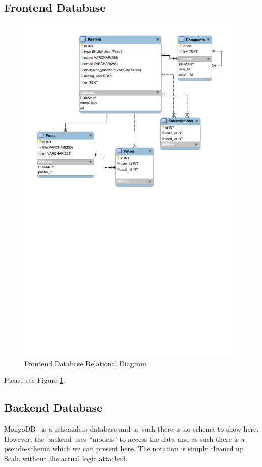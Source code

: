 \documentclass[11pt,letterpaper,titlepage]{article}
\begin{document}
\subsection{Frontend Database}
\begin{figure}
\centering
\includegraphics[angle=90, scale=1.55]{db_diagram.pdf}
\caption{Frontend Database Relational Diagram}
\label{fig:database}
\end{figure}
Please see Figure \ref{fig:database}.
\subsection{Backend Database}
MongoDB~\cite{mongodb} is a schemaless database and as such there is no schema
to show here. However, the backend uses ``models'' to access the data and as
such there is a pseudo-schema which we can present here. The notation is simply
cleaned up Scala without the actual logic attached.
\end{document}
